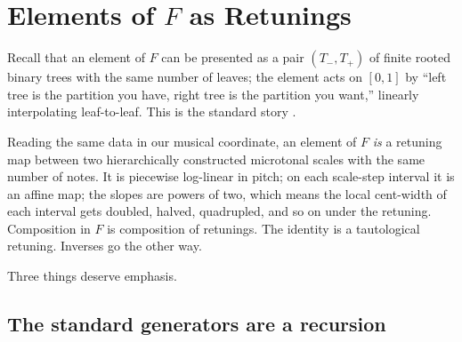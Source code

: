 \documentclass[11pt]{article}
\begin{document}
\begin{center}
\hspace{1.5em}
\end{center}

\section{Elements of $F$ as Retunings}

Recall that an element of $F$ can be presented as a pair $(T_-, T_+)$ of finite rooted binary trees with the same number of leaves; the element acts on $[0,1]$ by ``left tree is the partition you have, right tree is the partition you want,'' linearly interpolating leaf-to-leaf. This is the standard story \cite{CFP}.

Reading the same data in our musical coordinate, an element of $F$ \emph{is} a retuning map between two hierarchically constructed microtonal scales with the same number of notes. It is piecewise log-linear in pitch; on each scale-step interval it is an affine map; the slopes are powers of two, which means the local cent-width of each interval gets doubled, halved, quadrupled, and so on under the retuning. Composition in $F$ is composition of retunings. The identity is a tautological retuning. Inverses go the other way.

Three things deserve emphasis.

\subsection*{The standard generators are a recursion}
\end{document}
